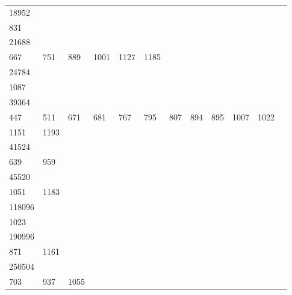 \begin{longtable}{llllllllllll}
18952&&&&&&&&&&&\\
831& \\
21688&&&&&&&&&&&\\
667& 751& 889& 1001& 1127& 1185\\
24784&&&&&&&&&&&\\
1087& \\
39364&&&&&&&&&&&\\
447& 511& 671& 681& 767& 795& 807& 894& 895& 1007& 1022\\
1151& 1193& \\
41524&&&&&&&&&&&\\
639& 959& \\
45520&&&&&&&&&&&\\
1051& 1183& \\
118096&&&&&&&&&&&\\
1023& \\
190996&&&&&&&&&&&\\
871& 1161& \\
250504&&&&&&&&&&&\\
703& 937& 1055\\
\bottomrule\end{longtable}
